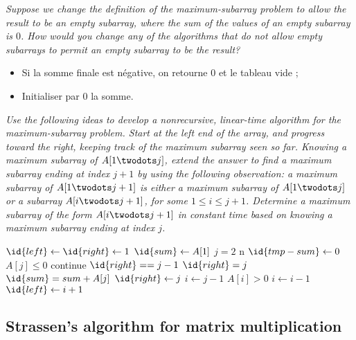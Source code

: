 \begin{description}
   {\itshape Suppose we change the definition of the maximum-subarray problem to allow the result to be an empty subarray, where the sum of the values of an empty subarray is $0$. How would you change any of the algorithms that do not allow empty subarrays to permit an empty subarray to be the result?}

    \begin{ex} %
      \begin{itemize}
        \item Si la somme finale est négative, on retourne $0$ et le tableau vide ;
        \item Initialiser par $0$ la somme.
      \end{itemize}
    \end{ex}

   {\itshape Use the following ideas to develop a nonrecursive, linear-time algorithm for the maximum-subarray problem. Start at the left end of the array, and progress toward the right, keeping track of the maximum subarray seen so far. Knowing a maximum subarray of $A[1 \twodots j]$, extend the answer to find a maximum subarray ending at index $j+1$ by using the following observation: a maximum subarray of $A[1 \twodots j + 1]$ is either a maximum subarray of $A[1 \twodots j]$ or a subarray $A[i \twodots j + 1]$, for some $1 \le i \le j + 1$. Determine a maximum subarray of the form $A[i \twodots j + 1]$ in constant time based on knowing a maximum subarray ending at index $j$.}

    \begin{ex} %
      \begin{codebox}
        \li $\id{left} \gets \id{right} \gets 1$
        \li $\id{sum} \gets A[1]$
        \li \For $j = 2$ \To n \Do
        \li $\id{tmp-sum} \gets 0$
        \li \If $A[j] \le 0$ \Then
        \li continue
        \li \Else \If $\id{right} == j - 1$
        \li $\id{right} = j$
        \li $\id{sum} = sum + A[j]$
        \li \Else
        \li $\id{right} \gets j$
        \li $i \gets j - 1$
        \li \While $A[i] > 0$ \Then
        \li $i \gets i - 1$
        \li $\id{left} \gets i + 1$ \End \End \End
        \li \Return {}
      \end{codebox}
    \end{ex}

\end{description}

\subsection{Strassen’s algorithm for matrix multiplication}

